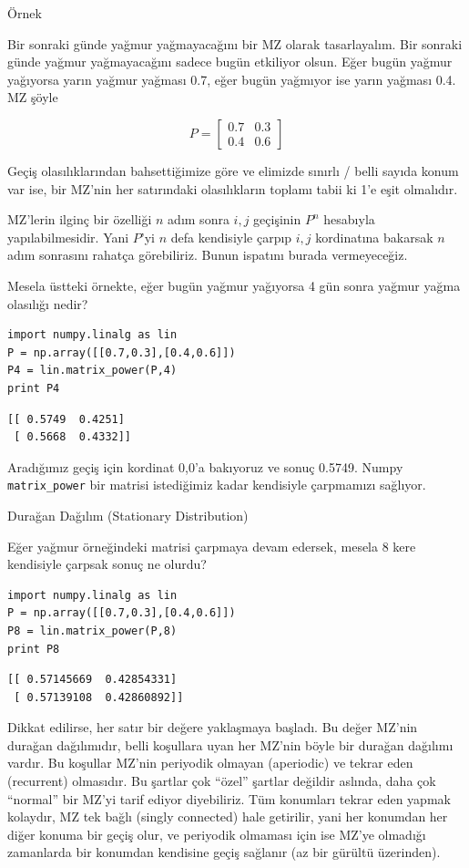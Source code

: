 \documentclass[12pt,fleqn]{article}\usepackage{../../common}
\begin{document}
Örnek

Bir sonraki günde yağmur yağmayacağını bir MZ olarak tasarlayalım. Bir
sonraki günde yağmur yağmayacağını sadece bugün etkiliyor olsun. Eğer bugün
yağmur yağıyorsa yarın yağmur yağması 0.7, eğer bugün yağmıyor ise yarın
yağması 0.4. MZ şöyle

$$ 
P =
\left[\begin{array}{cc}
0.7 & 0.3 \\
0.4 & 0.6
\end{array}\right]
 $$

Geçiş olasılıklarından bahsettiğimize göre ve elimizde sınırlı / belli
sayıda konum var ise, bir MZ'nin her satırındaki olasılıkların toplamı
tabii ki 1'e eşit olmalıdır. 

MZ'lerin ilginç bir özelliği $n$ adım sonra $i,j$ geçişinin $P^n$ hesabıyla
yapılabilmesidir. Yani $P$'yi $n$ defa kendisiyle çarpıp $i,j$ kordinatına 
bakarsak $n$ adım sonrasını rahatça görebiliriz. Bunun ispatını burada
vermeyeceğiz. 

Mesela üstteki örnekte, eğer bugün yağmur yağıyorsa 4 gün sonra yağmur
yağma olasılığı nedir? 

\begin{verbatim}
import numpy.linalg as lin
P = np.array([[0.7,0.3],[0.4,0.6]])
P4 = lin.matrix_power(P,4)
print P4
\end{verbatim}

\begin{verbatim}
[[ 0.5749  0.4251]
 [ 0.5668  0.4332]]
\end{verbatim}

Aradığımız geçiş için kordinat 0,0'a bakıyoruz ve sonuç 0.5749. Numpy
\verb!matrix_power! bir matrisi istediğimiz kadar kendisiyle çarpmamızı
sağlıyor. 

Durağan Dağılım (Stationary Distribution)

Eğer yağmur örneğindeki matrisi çarpmaya devam edersek, mesela 8 kere
kendisiyle çarpsak sonuç ne olurdu? 

\begin{verbatim}
import numpy.linalg as lin
P = np.array([[0.7,0.3],[0.4,0.6]])
P8 = lin.matrix_power(P,8)
print P8
\end{verbatim}

\begin{verbatim}
[[ 0.57145669  0.42854331]
 [ 0.57139108  0.42860892]]
\end{verbatim}

Dikkat edilirse, her satır bir değere yaklaşmaya başladı. Bu değer MZ'nin
durağan dağılımıdır, belli koşullara uyan her MZ'nin böyle bir durağan
dağılımı vardır. Bu koşullar MZ'nin periyodik olmayan (aperiodic) ve tekrar
eden (recurrent) olmasıdır. Bu şartlar çok ``özel'' şartlar değildir
aslında, daha çok ``normal'' bir MZ'yi tarif ediyor diyebiliriz. Tüm
konumları tekrar eden yapmak kolaydır, MZ tek bağlı (singly connected) hale
getirilir, yani her konumdan her diğer konuma bir geçiş olur, ve periyodik
olmaması için ise MZ'ye olmadığı zamanlarda bir konumdan kendisine geçiş
sağlanır (az bir gürültü üzerinden). 
\end{document}
